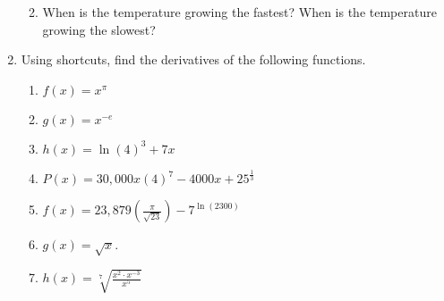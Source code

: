 \documentclass[11pt]{article}
\begin{document}
\begin{enumerate}
\begin{enumerate}
\begin{center}
\begin{tikzpicture}[yscale = 7/80]
      \end{tikzpicture}
    \end{center}
  \item When is the temperature growing the fastest?  When is the
    temperature growing the slowest?
    \vfill
  \end{enumerate}

\item Using shortcuts, find the derivatives of the following
  functions.
  \begin{enumerate}
  \item $f(x)=x^\pi$
    \vfill
    \newpage
  \item $g(x)=x^{-e}$
    \vfill
  \item $h(x)=\ln(4)^3+7x$
    \vfill
  \item $\displaystyle P(x)=30,000x(4)^7-4000x+25^{\frac{1}{3}}$
    \vfill
    \newpage
  \item $\displaystyle
    f(x)=23,879\left(\frac{\pi}{\sqrt{23}}\right)-7^{\ln(2300)}$
    \vfill
  \item $g(x) = \sqrt{x}$.
    \vfill
  \item $h(x) = \displaystyle\sqrt[7]{\frac{x^2\cdot x^{-3}}{x^5}}$
    \vfill
  \end{enumerate}

\end{enumerate}
\end{document}
